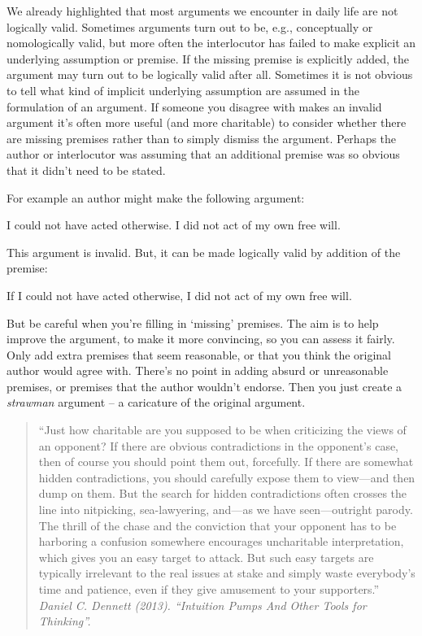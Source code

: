 
We already highlighted that most arguments we encounter in daily life are not logically valid. Sometimes arguments turn out to be, e.g., conceptually or nomologically valid, but more often the interlocutor has failed to make explicit an underlying assumption or premise. If the missing premise is explicitly added, the argument may turn out to be logically valid after all. Sometimes it is not obvious to tell what kind of implicit underlying assumption are assumed in the formulation of an argument. If someone you disagree with makes an invalid
argument it’s often more useful (and more charitable) to consider
whether there are missing premises rather than to simply dismiss the argument. Perhaps the author or interlocutor was assuming that an additional
premise was so obvious that it didn’t need to be stated.

For example an author might make the following argument:
\begin{earg}
\prem I could not have acted otherwise.
\conc I did not act of my own free will.
\end{earg}
This argument is invalid. But, it can be made logically valid by addition of the premise:
\begin{earg}
\prem If I could not have acted otherwise, I did not act of my own free will.
\end{earg}

But be careful when you’re filling in ‘missing’ premises.
The aim is to help improve the argument, to make it
more convincing, so you can assess it fairly.
Only add extra premises that seem reasonable, or that you think
the original author would agree with.
There’s no point in adding absurd or unreasonable
premises, or premises that the author wouldn’t
endorse. Then you just create a \emph{strawman} argument –
a caricature of the original argument.


\begin{quotation}
“Just how charitable are you supposed to be when criticizing the views of an opponent? If there are obvious contradictions in the opponent’s case, then of course you should point them out, forcefully. If there are somewhat hidden contradictions, you should carefully expose them to view—and then dump on them. But the search for hidden contradictions often crosses the line into nitpicking, sea-lawyering, and—as we have seen—outright parody. The thrill of the chase and the conviction that your opponent has to be harboring a confusion somewhere encourages uncharitable interpretation, which gives you an easy target to attack. But such easy targets are typically irrelevant to the real issues at stake and simply waste everybody’s time and patience, even if they give amusement to your supporters.''\\
\emph{Daniel C. Dennett (2013). “Intuition Pumps And Other Tools for Thinking”. }
\end{quotation}


